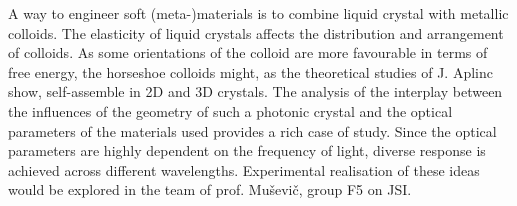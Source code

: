 \documentclass[a4paper,10pt]{article}
\begin{document}
% 
%
%
%



A way to engineer soft (meta-)materials is to combine liquid crystal with metallic colloids. 
The elasticity of liquid crystals affects the distribution and arrangement of colloids. 
As some orientations of the colloid are more favourable in terms of free energy, the horseshoe colloids might, as the theoretical studies of J. Aplinc \cite{jure-HS} show, self-assemble in 2D and 3D crystals. 
The analysis of the interplay between the influences of the geometry of such a photonic crystal and the optical parameters of the materials used provides a rich case of study. 
Since the optical parameters are highly dependent on the frequency of light, diverse response is achieved across different wavelengths. 
Experimental realisation of these ideas would be explored in the team of prof. Muševič, group F5 on JSI. 
\end{document}
